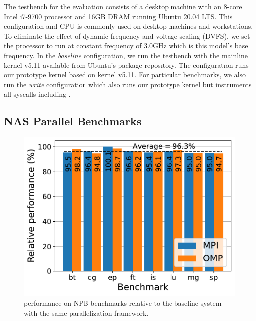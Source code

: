 \documentclass[letterpaper,twocolumn,10pt, anonymous]{article}
\begin{document}
The testbench for the evaluation consists of a desktop machine 
with an 8-core Intel i7-9700 processor and 16GB DRAM running 
Ubuntu 20.04 LTS. This configuration and CPU is commonly used on desktop
machines and workstations.
%
To eliminate the effect of dynamic frequency and voltage 
scaling (DVFS), we set the processor to run at constant 
frequency of 3.0GHz which is this model's base frequency.
In the \emph{baseline} configuration, we run the testbench 
with the mainline kernel v5.11 available from Ubuntu's package 
repository.
The \emph{\tiktok} configuration runs our prototype \tiktok kernel 
based on kernel v5.11.
For particular benchmarks, we also run the \emph{\tiktok{+}write}
configuration which also runs our prototype \tiktok kernel
but instruments all syscalls including .


\subsection{NAS Parallel Benchmarks}

\begin{figure}[]
  \includegraphics[width=\linewidth]{img/npb_performance.pdf}
  \caption{\tiktok performance on NPB benchmarks relative to the baseline 
          system with the same parallelization framework.}
  \label{fig:npb_performance}
\end{figure}
\end{document}
